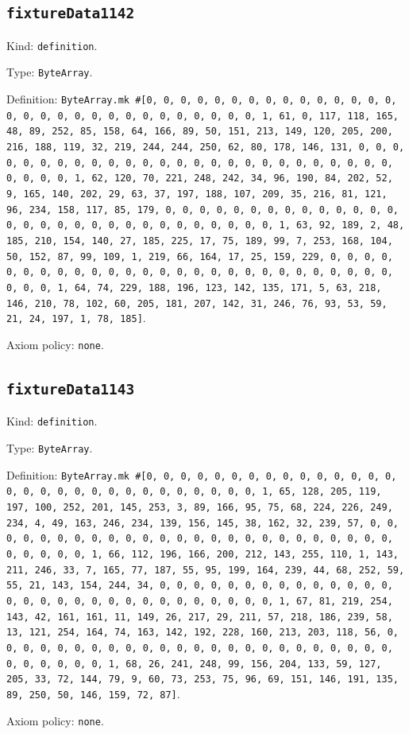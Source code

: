 \documentclass[11pt]{article}
\begin{document}
\subsection*{\texttt{fixtureData1142}}
\noindent Kind: \texttt{definition}.\par
\noindent Type: \texttt{ByteArray}.\par
\noindent Definition: \texttt{ByteArray.mk \#[0, 0, 0, 0, 0, 0, 0, 0, 0, 0, 0, 0, 0, 0, 0, 0, 0, 0, 0, 0, 0, 0, 0, 0, 0, 0, 0, 0, 0, 0, 1, 61, 0, 117, 118, 165, 48, 89, 252, 85, 158, 64, 166, 89, 50, 151, 213, 149, 120, 205, 200, 216, 188, 119, 32, 219, 244, 244, 250, 62, 80, 178, 146, 131, 0, 0, 0, 0, 0, 0, 0, 0, 0, 0, 0, 0, 0, 0, 0, 0, 0, 0, 0, 0, 0, 0, 0, 0, 0, 0, 0, 0, 0, 0, 1, 62, 120, 70, 221, 248, 242, 34, 96, 190, 84, 202, 52, 9, 165, 140, 202, 29, 63, 37, 197, 188, 107, 209, 35, 216, 81, 121, 96, 234, 158, 117, 85, 179, 0, 0, 0, 0, 0, 0, 0, 0, 0, 0, 0, 0, 0, 0, 0, 0, 0, 0, 0, 0, 0, 0, 0, 0, 0, 0, 0, 0, 0, 0, 1, 63, 92, 189, 2, 48, 185, 210, 154, 140, 27, 185, 225, 17, 75, 189, 99, 7, 253, 168, 104, 50, 152, 87, 99, 109, 1, 219, 66, 164, 17, 25, 159, 229, 0, 0, 0, 0, 0, 0, 0, 0, 0, 0, 0, 0, 0, 0, 0, 0, 0, 0, 0, 0, 0, 0, 0, 0, 0, 0, 0, 0, 0, 0, 1, 64, 74, 229, 188, 196, 123, 142, 135, 171, 5, 63, 218, 146, 210, 78, 102, 60, 205, 181, 207, 142, 31, 246, 76, 93, 53, 59, 21, 24, 197, 1, 78, 185]}.\par
\noindent Axiom policy: \texttt{none}.\par
\subsection*{\texttt{fixtureData1143}}
\noindent Kind: \texttt{definition}.\par
\noindent Type: \texttt{ByteArray}.\par
\noindent Definition: \texttt{ByteArray.mk \#[0, 0, 0, 0, 0, 0, 0, 0, 0, 0, 0, 0, 0, 0, 0, 0, 0, 0, 0, 0, 0, 0, 0, 0, 0, 0, 0, 0, 0, 0, 1, 65, 128, 205, 119, 197, 100, 252, 201, 145, 253, 3, 89, 166, 95, 75, 68, 224, 226, 249, 234, 4, 49, 163, 246, 234, 139, 156, 145, 38, 162, 32, 239, 57, 0, 0, 0, 0, 0, 0, 0, 0, 0, 0, 0, 0, 0, 0, 0, 0, 0, 0, 0, 0, 0, 0, 0, 0, 0, 0, 0, 0, 0, 0, 1, 66, 112, 196, 166, 200, 212, 143, 255, 110, 1, 143, 211, 246, 33, 7, 165, 77, 187, 55, 95, 199, 164, 239, 44, 68, 252, 59, 55, 21, 143, 154, 244, 34, 0, 0, 0, 0, 0, 0, 0, 0, 0, 0, 0, 0, 0, 0, 0, 0, 0, 0, 0, 0, 0, 0, 0, 0, 0, 0, 0, 0, 0, 0, 1, 67, 81, 219, 254, 143, 42, 161, 161, 11, 149, 26, 217, 29, 211, 57, 218, 186, 239, 58, 13, 121, 254, 164, 74, 163, 142, 192, 228, 160, 213, 203, 118, 56, 0, 0, 0, 0, 0, 0, 0, 0, 0, 0, 0, 0, 0, 0, 0, 0, 0, 0, 0, 0, 0, 0, 0, 0, 0, 0, 0, 0, 0, 0, 1, 68, 26, 241, 248, 99, 156, 204, 133, 59, 127, 205, 33, 72, 144, 79, 9, 60, 73, 253, 75, 96, 69, 151, 146, 191, 135, 89, 250, 50, 146, 159, 72, 87]}.\par
\noindent Axiom policy: \texttt{none}.\par
\end{document}
